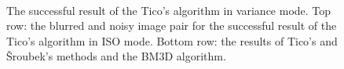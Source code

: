 \documentclass[12pt,notitlepage]{report}
\begin{document}
\begin{figure}[htb]
	  ~
	  ~
  \caption[The successful result of the Tico's algorithm in variance mode.]{The successful result of the Tico's algorithm in variance mode. Top row: the blurred and noisy image pair for the successful result of the Tico's algorithm in ISO mode. Bottom row: the results of Tico's and Šroubek's methods and the BM3D algorithm.}
  \label{fig:tico09_var_success}
\end{figure}

\clearpage
\end{document}
